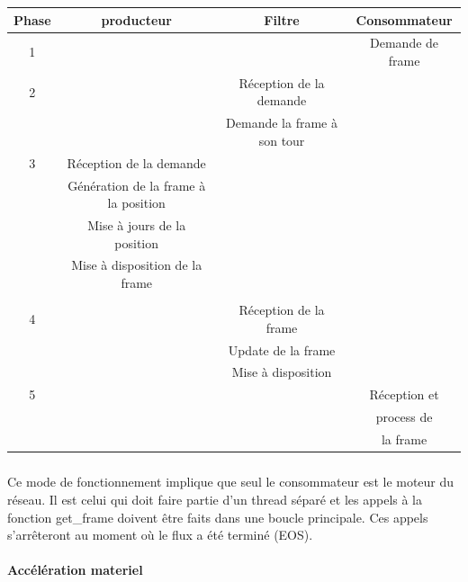 \begin{center}

  \begin{longtable}{ | c | c | c | c |}

    \hline

Phase & producteur & Filtre & Consommateur    \\ \hline \hline

1 & & & Demande de frame \\ \hline

2 & & Réception de la demande & \\

  & & Demande la frame à son tour & \\ \hline

3 & Réception de la demande & & \\

  & Génération de la frame à la position & & \\

  & Mise à jours de la position & & \\

  & Mise à disposition de la frame & & \\ & & & \\ \hline

4 & & Réception de la frame       & \\

  & & Update de la frame & \\

  & & Mise à disposition & \\ \hline

5 & & & Réception et    \\

  & & & process de      \\

  & & & la frame        \\ \hline

  \end{longtable}

\end{center}

\subparagraph{}

Ce mode de fonctionnement implique que seul le consommateur est le moteur
du réseau. Il est celui qui doit faire partie d'un thread séparé
et les appels à la fonction get\_frame doivent être faits dans une
boucle principale.  Ces appels s'arrêteront au moment où le flux a
été terminé (EOS).


\paragraph{Accélération materiel}

